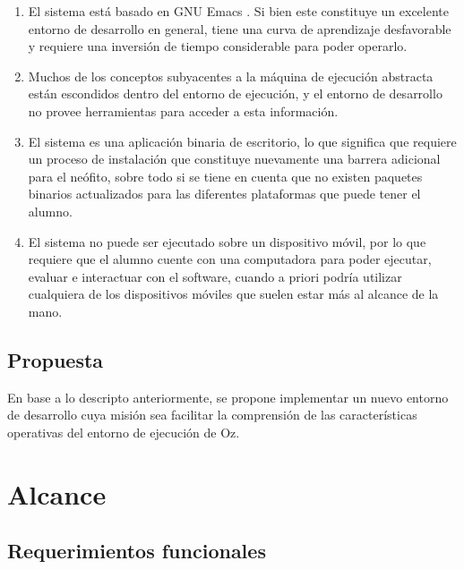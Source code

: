 \documentclass[a4paper,11pt]{article}
\begin{document}
\begin{enumerate}

  \item El sistema está basado en GNU Emacs \cite{emacs}. Si bien este
    constituye un excelente entorno de desarrollo en general, tiene una curva
    de aprendizaje desfavorable y requiere una inversión de tiempo considerable
    para poder operarlo.

  \item Muchos de los conceptos subyacentes a la máquina de ejecución abstracta
    están escondidos dentro del entorno de ejecución, y el entorno de desarrollo
    no provee herramientas para acceder a esta información.

  \item El sistema es una aplicación binaria de escritorio, lo que significa que
    requiere un proceso de instalación que constituye nuevamente una barrera
    adicional para el neófito, sobre todo si se tiene en cuenta que no existen
    paquetes binarios actualizados para las diferentes plataformas que puede
    tener el alumno.

  \item El sistema no puede ser ejecutado sobre un dispositivo móvil, por lo que
    requiere que el alumno cuente con una computadora para poder ejecutar,
    evaluar e interactuar con el software, cuando a priori podría utilizar
    cualquiera de los dispositivos móviles que suelen estar más al alcance de la
    mano.

\end{enumerate}

\subsection{Propuesta}

En base a lo descripto anteriormente, se propone implementar un nuevo entorno
de desarrollo cuya misión sea facilitar la comprensión de las características
operativas del entorno de ejecución de Oz.

\section{Alcance}

\subsection{Requerimientos funcionales}
\end{document}

